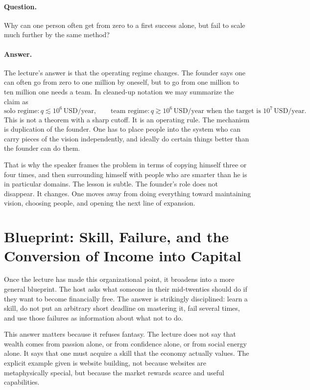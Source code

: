 \paragraph{Question.} Why can one person often get from zero to a first success alone, but fail to scale much further by the same method?

\paragraph{Answer.} The lecture's answer is that the operating regime changes. The founder says one can often go from zero to one million by oneself, but to go from one million to ten million one needs a team. In cleaned-up notation we may summarize the claim as
\begin{equation}
\text{solo regime}: q \lesssim 10^6 \,\mathrm{USD/year}, \qquad
\text{team regime}: q \gtrsim 10^6 \,\mathrm{USD/year} \text{ when the target is } 10^7 \,\mathrm{USD/year}.
\end{equation}
This is not a theorem with a sharp cutoff. It is an operating rule. The mechanism is duplication of the founder. One has to place people into the system who can carry pieces of the vision independently, and ideally do certain things better than the founder can do them.

That is why the speaker frames the problem in terms of copying himself three or four times, and then surrounding himself with people who are smarter than he is in particular domains. The lesson is subtle. The founder's role does not disappear. It changes. One moves away from doing everything toward maintaining vision, choosing people, and opening the next line of expansion.

\section{Blueprint: Skill, Failure, and the Conversion of Income into Capital}

Once the lecture has made this organizational point, it broadens into a more general blueprint. The host asks what someone in their mid-twenties should do if they want to become financially free. The answer is strikingly disciplined: learn a skill, do not put an arbitrary short deadline on mastering it, fail several times, and use those failures as information about what not to do.

This answer matters because it refuses fantasy. The lecture does not say that wealth comes from passion alone, or from confidence alone, or from social energy alone. It says that one must acquire a skill that the economy actually values. The explicit example given is website building, not because websites are metaphysically special, but because the market rewards scarce and useful capabilities.

